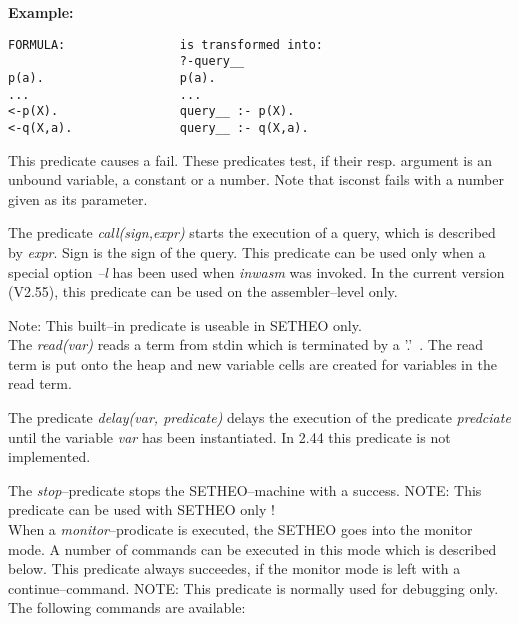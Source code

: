 {\bf Example:}
\begin{verbatim}
FORMULA:                is transformed into:
                        ?-query__
p(a).                   p(a).
...                     ...
<-p(X).                 query__ :- p(X).
<-q(X,a).               query__ :- q(X,a).
\end{verbatim}
This predicate causes a fail.
These predicates test, if their resp. argument is an unbound variable,
a constant or a number. Note that isconst fails with a number given as its parameter.

The predicate {\it call(sign,expr)\/} starts the execution of a query,
which is described by {\it expr\/}. Sign is the sign of the query.
This predicate can be used only when 
a special option {\it --l\/} has been used when {\it inwasm\/} was invoked.
In the current version (V2.55), this predicate can be used on the assembler--level
only.

Note: This built--in predicate is useable in SETHEO only.\\
The {\it read(var)\/} reads a term from stdin which is terminated
by a '.\@'\ . The read term is put onto the heap and new variable cells are
created for variables in the read term.

The predicate {\it delay(var, predicate)\/}
delays the execution of the predicate {\it predciate\/} until the variable
{\it var\/} has been instantiated. In 2.44 this predicate is not implemented.

The {\it stop\/}--predicate stops the SETHEO--machine with
a success.
NOTE: This predicate can be used with SETHEO only !\\
When a {\it monitor\/}--prodicate is executed, the SETHEO
goes into the monitor mode. A number of commands can be executed
in this mode which is described below.
This predicate always succeedes, if the monitor mode is left with
a continue--command. NOTE: This predicate is normally used for debugging
only.
The following commands are available:
\vspace{5mm}


